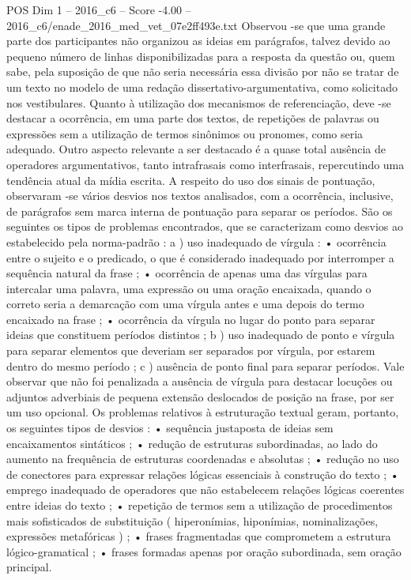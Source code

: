 \begin{textsample}{POS Dim 1 – 2016\_c6 – Score -4.00 – 2016\_c6/enade\_2016\_med\_vet\_07e2ff493e.txt}
Observou -se que uma grande parte dos participantes não organizou as ideias em parágrafos, talvez devido ao pequeno número de linhas disponibilizadas para a resposta da questão ou, quem sabe, pela suposição de que não seria necessária essa divisão por não se tratar de um texto no modelo de uma redação dissertativo-argumentativa, como solicitado nos vestibulares.
Quanto à utilização dos mecanismos de referenciação, deve -se destacar a ocorrência, em uma parte dos textos, de repetições de palavras ou expressões sem a utilização de termos sinônimos ou pronomes, como seria adequado.
Outro aspecto relevante a ser destacado é a quase total ausência de operadores argumentativos, tanto intrafrasais como interfrasais, repercutindo uma tendência atual da mídia escrita.
A respeito do uso dos sinais de pontuação, observaram -se vários desvios nos textos analisados, com a ocorrência, inclusive, de parágrafos sem marca interna de pontuação para separar os períodos.
São os seguintes os tipos de problemas encontrados, que se caracterizam como desvios ao estabelecido pela norma-padrão : a ) uso inadequado de vírgula : • ocorrência entre o sujeito e o predicado, o que é considerado inadequado por interromper a sequência natural da frase ; • ocorrência de apenas uma das vírgulas para intercalar uma palavra, uma expressão ou uma oração encaixada, quando o correto seria a demarcação com uma vírgula antes e uma depois do termo encaixado na frase ; • ocorrência da vírgula no lugar do ponto para separar ideias que constituem períodos distintos ; b ) uso inadequado de ponto e vírgula para separar elementos que deveriam ser separados por vírgula, por estarem dentro do mesmo período ; c ) ausência de ponto final para separar períodos.
Vale observar que não foi penalizada a ausência de vírgula para destacar locuções ou adjuntos adverbiais de pequena extensão deslocados de posição na frase, por ser um uso opcional.
Os problemas relativos à estruturação textual geram, portanto, os seguintes tipos de desvios : • sequência justaposta de ideias sem encaixamentos sintáticos ; • redução de estruturas subordinadas, ao lado do aumento na frequência de estruturas coordenadas e absolutas ; • redução no uso de conectores para expressar relações lógicas essenciais à construção do texto ; • emprego inadequado de operadores que não estabelecem relações lógicas coerentes entre ideias do texto ; • repetição de termos sem a utilização de procedimentos mais sofisticados de substituição ( hiperonímias, hiponímias, nominalizações, expressões metafóricas ) ; • frases fragmentadas que comprometem a estrutura lógico-gramatical ; • frases formadas apenas por oração subordinada, sem oração principal.

\end{textsample}
